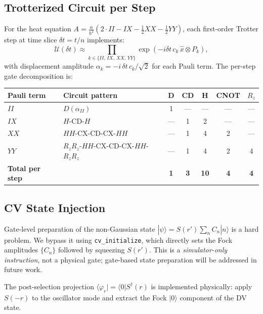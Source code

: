 \documentclass[11pt]{article}
\begin{document}
\subsection{Trotterized Circuit per Step}

For the heat equation $A = \tfrac{\alpha}{h^2}(2\cdot II - IX
- \tfrac{1}{2}XX - \tfrac{1}{2}YY)$, each first-order Trotter step
at time slice $\delta t = t/n$ implements:
\begin{equation}
  \mathcal{U}(\delta t)
  \approx
  \prod_{k \in \{II,\, IX,\, XX,\, YY\}}
  \exp\!\left(-i\delta t\, c_k\, \hat{x} \otimes P_k\right),
\end{equation}
with displacement amplitude $\alpha_k = -i\,\delta t\, c_k / \sqrt{2}$
for each Pauli term.  The per-step gate decomposition is:

\begin{center}
\begin{tabular}{llccccc}
  \toprule
  Pauli term & Circuit pattern & D & CD & H & CNOT & $R_z$ \\
  \midrule
  $II$ & $D(\alpha_{II})$ & 1 & --- & --- & --- & --- \\
  $IX$ & $H$-$\mathrm{CD}$-$H$ & --- & 1 & 2 & --- & --- \\
  $XX$ & $HH$-$\mathrm{CX}$-$\mathrm{CD}$-$\mathrm{CX}$-$HH$ & --- & 1 & 4 & 2 & --- \\
  $YY$ & $R_z R_z$-$HH$-$\mathrm{CX}$-$\mathrm{CD}$-$\mathrm{CX}$-$HH$-$R_z R_z$
       & --- & 1 & 4 & 2 & 4 \\
  \midrule
  \textbf{Total per step} & & \textbf{1} & \textbf{3} & \textbf{10}
  & \textbf{4} & \textbf{4} \\
  \bottomrule
\end{tabular}
\end{center}

\subsection{CV State Injection}

Gate-level preparation of the non-Gaussian state
$|\psi\rangle = S(r')\sum_n C_n|n\rangle$ is a hard problem.
We bypass it using \texttt{cv\_initialize}, which directly sets the
Fock amplitudes $\{C_n\}$ followed by squeezing $S(r')$.
This is a \emph{simulator-only instruction}, not a physical gate;
gate-based state preparation will be addressed in future work.

The post-selection projection $\langle\varphi_r| = \langle 0|S^\dagger(r)$
is implemented physically: apply $S(-r)$ to the oscillator mode and
extract the Fock $|0\rangle$ component of the DV state.
\end{document}
